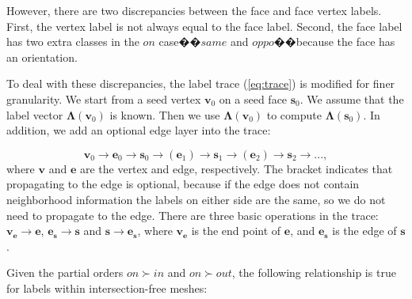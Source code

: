 However, there are two discrepancies between the face and face vertex labels. First, the vertex label is not always equal to the face label. Second, the face label has two extra classes in the $on$ case��$same$ and $oppo$��because the face has an orientation.


To deal with these discrepancies, the label trace (\ref{eq:trace}) is modified for finer granularity. We start from a seed vertex $\bm{v}_0$ on a seed face $\bm{s}_0$. We assume that the label vector $\bm{\Lambda}(\bm{v}_0)$ is known. Then we use $\bm{\Lambda}(\bm{v}_0)$ to compute $\bm{\Lambda}(\bm{s}_0)$. In addition, we add an optional edge layer into the trace:

\begin{equation}
\bm{v}_0\to \bm{e}_0\to \bm{s}_0\to (\bm{e}_1)\to \bm{s}_1\to (\bm{e}_2)\to \bm{s}_2\to ...,
\end{equation}
where $\bm{v}$ and $\bm{e}$ are the vertex and edge, respectively. The bracket indicates that propagating to the edge is optional, because if the edge does not contain neighborhood information the labels on either side are the same, so we do not need to propagate to the edge. There are three basic operations in the trace: $\bm{v}_{\bm{e}}\to \bm{e}$, $\bm{e}_{\bm{s}}\to \bm{s}$ and $\bm{s}\to \bm{e}_{\bm{s}}$, where $\bm{v}_{\bm{e}}$ is the end point of $\bm{e}$, and $\bm{e}_{\bm{s}}$ is the edge of $\bm{s}$.

Given the partial orders $on \succ in$ and $on \succ out$, the following relationship is true for labels within intersection-free meshes:

